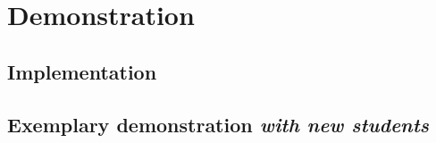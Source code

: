 \chapter{Demonstration}

\section{Implementation} \label{sec:Implementation}

\section{Exemplary demonstration \textit{with new students}} \label{sec:demo}